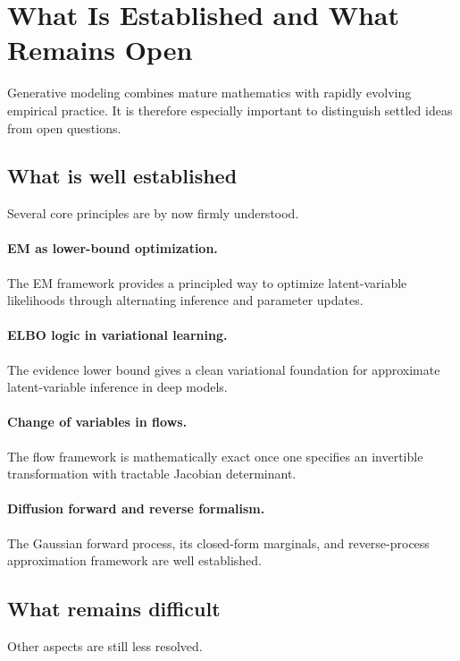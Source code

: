 \section{What Is Established and What Remains Open}

Generative modeling combines mature mathematics with rapidly evolving empirical practice.
It is therefore especially important to distinguish settled ideas from open questions.

\subsection*{What is well established}

Several core principles are by now firmly understood.

\paragraph{EM as lower-bound optimization.}
The EM framework provides a principled way to optimize latent-variable likelihoods through alternating inference and parameter updates.

\paragraph{ELBO logic in variational learning.}
The evidence lower bound gives a clean variational foundation for approximate latent-variable inference in deep models.

\paragraph{Change of variables in flows.}
The flow framework is mathematically exact once one specifies an invertible transformation with tractable Jacobian determinant.

\paragraph{Diffusion forward and reverse formalism.}
The Gaussian forward process, its closed-form marginals, and reverse-process approximation framework are well established.

\subsection*{What remains difficult}

Other aspects are still less resolved.

